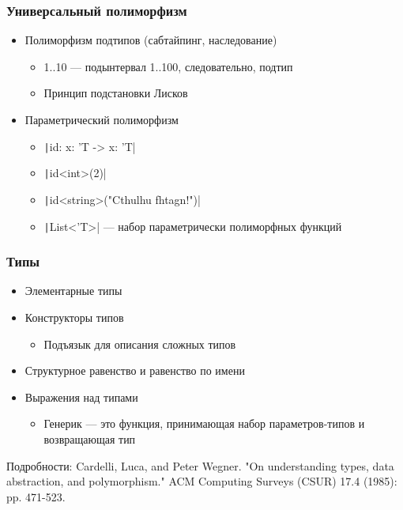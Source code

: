 \documentclass[xetex,mathserif,serif]{beamer}
\begin{document}
    \begin{frame}
        \frametitle{Универсальный полиморфизм}
        \begin{itemize}
            \item Полиморфизм подтипов (сабтайпинг, наследование)
            \begin{itemize}
                \item 1..10 --- подынтервал 1..100, следовательно, подтип
                \item Принцип подстановки Лисков
            \end{itemize}
            \item Параметрический полиморфизм
            \begin{itemize}
                \item \texttt|id: x: 'T -> x: 'T|
                \item \texttt|id<int>(2)|
                \item \texttt|id<string>("Cthulhu fhtagn!")|
                \item \texttt|List<'T>| --- набор параметрически полиморфных функций
            \end{itemize}
        \end{itemize}
    \end{frame}

    \begin{frame}
        \frametitle{Типы}
        \begin{itemize}
            \item Элементарные типы
            \item Конструкторы типов
            \begin{itemize}
                \item Подъязык для описания сложных типов
            \end{itemize}
            \item Структурное равенство и равенство по имени
            \item Выражения над типами
            \begin{itemize}
                \item Генерик --- это функция, принимающая набор параметров-типов и возвращающая тип
            \end{itemize}
        \end{itemize}

        Подробности: Cardelli, Luca, and Peter Wegner. "On understanding types, data abstraction, and polymorphism." ACM Computing Surveys (CSUR) 17.4 (1985): pp. 471-523.
    \end{frame}
\end{document}
